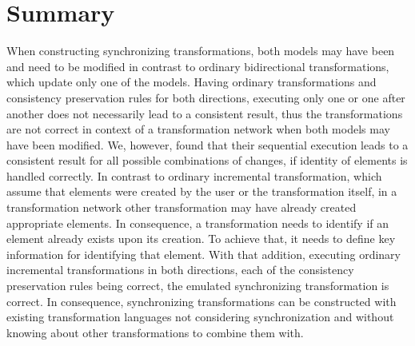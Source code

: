 \section{Summary}


\begin{insight}[Synchronization]
    When constructing synchronizing transformations, both models may have been and need to be modified in contrast to ordinary bidirectional transformations, which update only one of the models.
    Having ordinary transformations and consistency preservation rules for both directions, executing only one or one after another does not necessarily lead to a consistent result, thus the transformations are not correct in context of a transformation network when both models may have been modified.
    We, however, found that their sequential execution leads to a consistent result for all possible combinations of changes, if identity of elements is handled correctly.
    In contrast to ordinary incremental transformation, which assume that elements were created by the user or the transformation itself, in a transformation network other transformation may have already created appropriate elements.
    In consequence, a transformation needs to identify if an element already exists upon its creation.
    To achieve that, it needs to define key information for identifying that element.
    With that addition, executing ordinary incremental transformations in both directions, each of the consistency preservation rules being correct, the emulated synchronizing transformation is correct.
    In consequence, synchronizing transformations can be constructed with existing transformation languages not considering synchronization and without knowing about other transformations to combine them with.
\end{insight}

